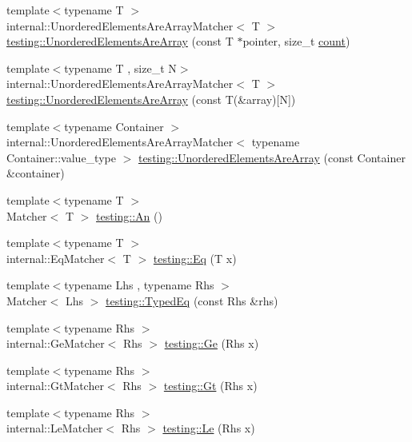 \begin{DoxyCompactItemize}
{\footnotesize template$<$typename T $>$ }\\internal\+::\+Unordered\+Elements\+Are\+Array\+Matcher$<$ T $>$ \hyperlink{namespacetesting_a99b9509a7cd405be28bf45231577384b}{testing\+::\+Unordered\+Elements\+Are\+Array} (const T $\ast$pointer, size\+\_\+t \hyperlink{gmock__stress__test_8cc_afd9db40e3361ae09188795e8cbe19752}{count})
\item 
{\footnotesize template$<$typename T , size\+\_\+t N$>$ }\\internal\+::\+Unordered\+Elements\+Are\+Array\+Matcher$<$ T $>$ \hyperlink{namespacetesting_a23c7729cfc61967f3271018076c4b724}{testing\+::\+Unordered\+Elements\+Are\+Array} (const T(\&array)\mbox{[}N\mbox{]})
\item 
{\footnotesize template$<$typename Container $>$ }\\internal\+::\+Unordered\+Elements\+Are\+Array\+Matcher$<$ typename Container\+::value\+\_\+type $>$ \hyperlink{namespacetesting_a72b0ee2217293106fcf4971dc4a59f4c}{testing\+::\+Unordered\+Elements\+Are\+Array} (const Container \&container)
\item 
{\footnotesize template$<$typename T $>$ }\\Matcher$<$ T $>$ \hyperlink{namespacetesting_a48792471ff9cdf5b4f95a4242df7bfbb}{testing\+::\+An} ()
\item 
{\footnotesize template$<$typename T $>$ }\\internal\+::\+Eq\+Matcher$<$ T $>$ \hyperlink{namespacetesting_a0cb8ba7eae844c871eccb29e7c81635f}{testing\+::\+Eq} (T x)
\item 
{\footnotesize template$<$typename Lhs , typename Rhs $>$ }\\Matcher$<$ Lhs $>$ \hyperlink{namespacetesting_a57c9aba17aaa27d818e80a1eec81070f}{testing\+::\+Typed\+Eq} (const Rhs \&rhs)
\item 
{\footnotesize template$<$typename Rhs $>$ }\\internal\+::\+Ge\+Matcher$<$ Rhs $>$ \hyperlink{namespacetesting_a42bb19b42d7830b972973a103d5e00f2}{testing\+::\+Ge} (Rhs x)
\item 
{\footnotesize template$<$typename Rhs $>$ }\\internal\+::\+Gt\+Matcher$<$ Rhs $>$ \hyperlink{namespacetesting_a493fc1bafd7b3945ba06ace80e74b0d5}{testing\+::\+Gt} (Rhs x)
\item 
{\footnotesize template$<$typename Rhs $>$ }\\internal\+::\+Le\+Matcher$<$ Rhs $>$ \hyperlink{namespacetesting_a2e33596921b80a7fdaff3f62bf18a478}{testing\+::\+Le} (Rhs x)

\end{DoxyCompactItemize}

